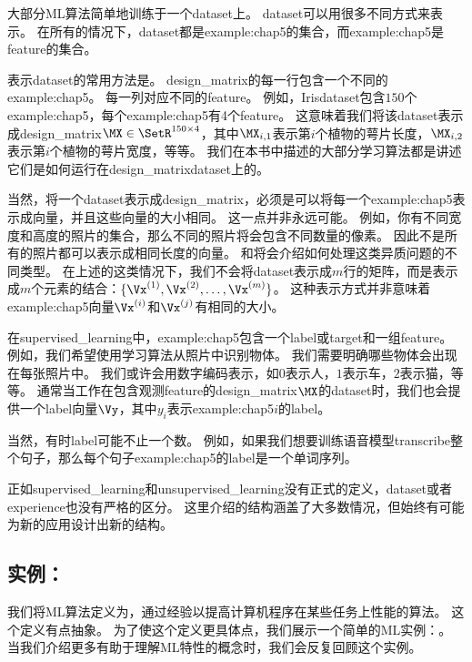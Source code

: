 大部分\gls{ML}算法简单地训练于一个\gls{dataset}上。
\gls{dataset}可以用很多不同方式来表示。
在所有的情况下，\gls{dataset}都是\gls{example:chap5}的集合，而\gls{example:chap5}是\gls{feature}的集合。

表示\gls{dataset}的常用方法是。
\gls{design_matrix}的每一行包含一个不同的\gls{example:chap5}。
每一列对应不同的\gls{feature}。
例如，Iris\gls{dataset}包含$150$个\gls{example:chap5}，每个\gls{example:chap5}有4个\gls{feature}。
这意味着我们将该\gls{dataset}表示成\gls{design_matrix}$\MX\in\SetR^{150\times 4}$，其中$\MX_{i,1}$表示第$i$个植物的萼片长度，$\MX_{i,2}$表示第$i$个植物的萼片宽度，等等。
我们在本书中描述的大部分学习算法都是讲述它们是如何运行在\gls{design_matrix}\gls{dataset}上的。

当然，将一个\gls{dataset}表示成\gls{design_matrix}，必须是可以将每一个\gls{example:chap5}表示成向量，并且这些向量的大小相同。
这一点并非永远可能。
例如，你有不同宽度和高度的照片的集合，那么不同的照片将会包含不同数量的像素。
因此不是所有的照片都可以表示成相同长度的向量。
和将会介绍如何处理这类异质问题的不同类型。
在上述的这类情况下，我们不会将\gls{dataset}表示成$m$行的矩阵，而是表示成$m$个元素的结合：$\{\Vx^{(1)},\Vx^{(2)},\dots,\Vx^{(m)}\}$。
这种表示方式并非意味着\gls{example:chap5}向量$\Vx^{(i)}$和$\Vx^{(j)}$有相同的大小。


在\gls{supervised_learning}中，\gls{example:chap5}包含一个\gls{label}或\gls{target}和一组\gls{feature}。
例如，我们希望使用学习算法从照片中识别物体。
我们需要明确哪些物体会出现在每张照片中。
我们或许会用数字编码表示，如$0$表示人，$1$表示车，$2$表示猫，等等。
通常当工作在包含观测\gls{feature}的\gls{design_matrix}$\MX$的\gls{dataset}时，我们也会提供一个\gls{label}向量$\Vy$，其中$y_i$表示\gls{example:chap5}$i$的\gls{label}。

当然，有时\gls{label}可能不止一个数。
例如，如果我们想要训练语音模型\gls{transcribe}整个句子，那么每个句子\gls{example:chap5}的\gls{label}是一个单词序列。

正如\gls{supervised_learning}和\gls{unsupervised_learning}没有正式的定义，\gls{dataset}或者\gls{experience}也没有严格的区分。
这里介绍的结构涵盖了大多数情况，但始终有可能为新的应用设计出新的结构。

\subsection{实例：}
\label{sec:example_linear_regression}
我们将\gls{ML}算法定义为，通过经验以提高计算机程序在某些任务上性能的算法。
这个定义有点抽象。
为了使这个定义更具体点，我们展示一个简单的\gls{ML}实例：。
当我们介绍更多有助于理解\gls{ML}特性的概念时，我们会反复回顾这个实例。

